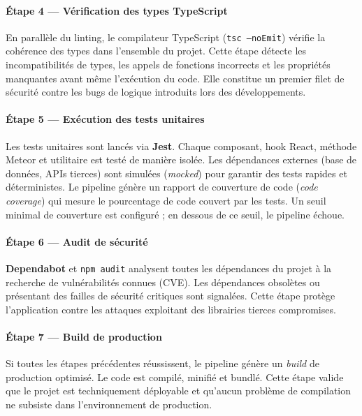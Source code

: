 \paragraph{Étape 4 — Vérification des types TypeScript}
En parallèle du linting, le compilateur TypeScript (\texttt{tsc --noEmit}) vérifie la
cohérence des types dans l'ensemble du projet. Cette étape détecte les incompatibilités
de types, les appels de fonctions incorrects et les propriétés manquantes avant même
l'exécution du code. Elle constitue un premier filet de sécurité contre les bugs de
logique introduits lors des développements.

\paragraph{Étape 5 — Exécution des tests unitaires}
Les tests unitaires sont lancés via \textbf{Jest}. Chaque composant, hook React, méthode
Meteor et utilitaire est testé de manière isolée. Les dépendances externes (base de données,
APIs tierces) sont simulées (\textit{mocked}) pour garantir des tests rapides et
déterministes. Le pipeline génère un rapport de couverture de code (\textit{code coverage})
qui mesure le pourcentage de code couvert par les tests. Un seuil minimal de couverture
est configuré ; en dessous de ce seuil, le pipeline échoue.

\paragraph{Étape 6 — Audit de sécurité}
\textbf{Dependabot} et \texttt{npm audit} analysent toutes les dépendances du projet à la
recherche de vulnérabilités connues (CVE). Les dépendances obsolètes ou présentant des
failles de sécurité critiques sont signalées. Cette étape protège l'application contre les
attaques exploitant des librairies tierces compromises.

\paragraph{Étape 7 — Build de production}
Si toutes les étapes précédentes réussissent, le pipeline génère un \textit{build} de
production optimisé. Le code est compilé, minifié et bundlé. Cette étape valide que le
projet est techniquement déployable et qu'aucun problème de compilation ne subsiste dans
l'environnement de production.

